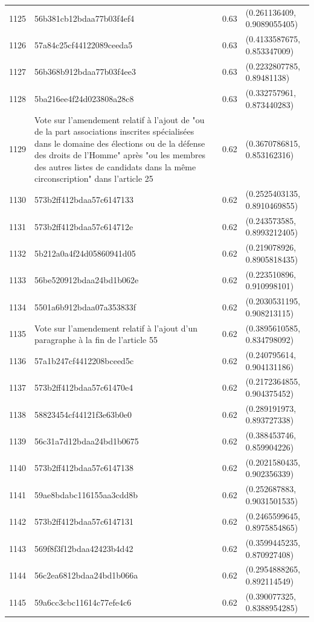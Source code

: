 \begin{table}[ht]
\begin{tabular}{rlrl}
  1125 & 56b381cb12bdaa77b03f4ef4 & 0.63 & (0.261136409, 0.9089055405) \\ 
  1126 & 57a84c25cf44122089ceeda5 & 0.63 & (0.4133587675, 0.853347009) \\ 
  1127 & 56b368b912bdaa77b03f4ee3 & 0.63 & (0.2232807785, 0.89481138) \\ 
  1128 & 5ba216ee4f24d023808a28c8 & 0.63 & (0.332757961, 0.873440283) \\ 
  1129 & Vote sur l'amendement relatif à l'ajout de "ou de la part associations inscrites spécialisées dans le domaine des élections ou de la défense des droits de l'Homme" après "ou les membres des autres listes de candidats dans la même circonscription" dans l'article 25 & 0.62 & (0.3670786815, 0.853162316) \\ 
  1130 & 573b2ff412bdaa57c6147133 & 0.62 & (0.2525403135, 0.8910469855) \\ 
  1131 & 573b2ff412bdaa57c614712e & 0.62 & (0.243573585, 0.8993212405) \\ 
  1132 & 5b212a0a4f24d05860941d05 & 0.62 & (0.219078926, 0.8905818435) \\ 
  1133 & 56be520912bdaa24bd1b062e & 0.62 & (0.223510896, 0.910998101) \\ 
  1134 & 5501a6b912bdaa07a353833f & 0.62 & (0.2030531195, 0.908213115) \\ 
  1135 & Vote sur l'amendement relatif à l'ajout d'un paragraphe à la fin de l'article 55 & 0.62 & (0.3895610585, 0.834798092) \\ 
  1136 & 57a1b247cf4412208bceed5c & 0.62 & (0.240795614, 0.904131186) \\ 
  1137 & 573b2ff412bdaa57c61470e4 & 0.62 & (0.2172364855, 0.904375452) \\ 
  1138 & 58823454cf44121f3e63b0e0 & 0.62 & (0.289191973, 0.893727338) \\ 
  1139 & 56c31a7d12bdaa24bd1b0675 & 0.62 & (0.388453746, 0.859904226) \\ 
  1140 & 573b2ff412bdaa57c6147138 & 0.62 & (0.2021580435, 0.902356339) \\ 
  1141 & 59ae8bdabc116155aa3cdd8b & 0.62 & (0.252687883, 0.9031501535) \\ 
  1142 & 573b2ff412bdaa57c6147131 & 0.62 & (0.2465599645, 0.8975854865) \\ 
  1143 & 569f8f3f12bdaa42423b4d42 & 0.62 & (0.3599445235, 0.870927408) \\ 
  1144 & 56c2ea6812bdaa24bd1b066a & 0.62 & (0.2954888265, 0.892114549) \\ 
  1145 & 59a6cc3cbc11614c77efe4c6 & 0.62 & (0.390077325, 0.8388954285) \\ 

\end{tabular}
\end{table}

